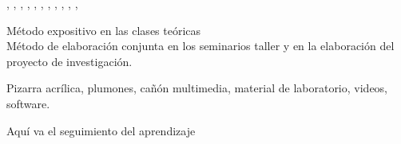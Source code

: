 \documentclass[a4paper,8pt]{article}
\begin{document}
\begin{contenidos}
\nextUnidad{\SESoftwareProjectManagement}
\nextCapitulo{\SESoftwareProjectManagement}
\nextTema{\SESoftwareProjectManagementTopicTeam}
\nextTema{\SESoftwareProjectManagementTopicEffort}
\nextTema{\SESoftwareProjectManagementTopicRisk}
\nextTema{\SESoftwareProjectManagementTopicTeamManagement}
\nextTema{\SESoftwareProjectManagementTopicProject}
\nextTema{\SESoftwareProjectManagementTopicSoftwareMeasurement}
\nextTema{\SESoftwareProjectManagementTopicSoftwareQuality}
\nextTema{\SESoftwareProjectManagementTopicRiskS}
\nextTema{\SESoftwareProjectManagementTopicSystem}

\cite{Pressman04}, \cite{Blum92}, \cite{Schach04}, \cite{Wang00}, \cite{Keyes04}, \cite{Windle02}, \cite{Priest01}, \cite{Schach04}, \cite{Montangero96}, \cite{Ambriola01}, \cite{Conradi00}, \cite{Oquendo03} 





\end{contenidos}




\begin{estrategiasEnsenanza}
    \begin{metodos}
        Método expositivo en las clases teóricas \\
        Método de elaboración conjunta en los seminarios taller y en la elaboración del proyecto de investigación.
    \end{metodos}
    \begin{medios}
        Pizarra acrílica, plumones, cañón multimedia, material de laboratorio, videos, software.
    \end{medios}
    \begin{formasOrganizacion}
    \end{formasOrganizacion}
    \begin{programacion}
    \end{programacion}
    \begin{segumientoAprendizaje}
        Aquí va el seguimiento del aprendizaje
    \end{segumientoAprendizaje}
\end{estrategiasEnsenanza}
\end{document}
